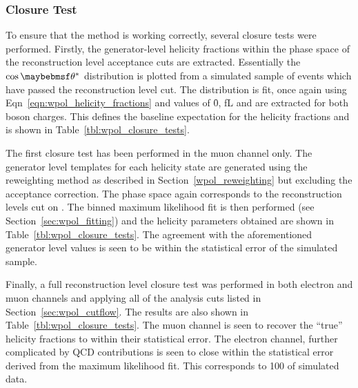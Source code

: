 \begin{figure}
\centering
{}\quad
{}\quad
\caption{}
\label{fig:wpol_genreco}
\end{figure}

\subsubsection{Closure Test}
To ensure that the method is working correctly, several closure tests were
performed. Firstly, the generator-level helicity fractions within the phase
space of the reconstruction level \PW acceptance cuts are extracted. Essentially
the $\cos\thetastar$ distribution is plotted from a simulated sample of events
which have passed the reconstruction level \PtW cut. The distribution is fit,
once again using Eqn~\ref{eqn:wpol_helicity_fractions} and values of \f0, fL and
\fR are extracted for both boson charges. This defines the baseline expectation
for the helicity fractions and is shown in Table~\ref{tbl:wpol_closure_tests}.

The first closure test has been performed in the muon channel only. The
generator level \LP templates for each helicity state are generated using the
reweighting method as described in Section~\ref{wpol_reweighting} but excluding
the acceptance correction. The phase space again corresponds to the
reconstruction levels cut on \PtW. The binned maximum likelihood fit is then
performed (see Section~\ref{sec:wpol_fitting}) and the helicity parameters
obtained are shown in Table~\ref{tbl:wpol_closure_tests}. The agreement with the
aforementioned generator level values is seen to be within the statistical error
of the simulated sample.

Finally, a full reconstruction level closure test was performed in both electron
and muon channels and applying all of the analysis cuts listed in
Section~\ref{sec:wpol_cutflow}. The results are also shown in
Table~\ref{tbl:wpol_closure_tests}. The muon channel is seen to recover the
``true'' helicity fractions to within their statistical error. The electron
channel, further complicated by \ac{QCD} contributions is seen to close within
the statistical error derived from the maximum likelihood fit. This corresponds
to \unit{100}{\invpicobarn} of simulated data.

